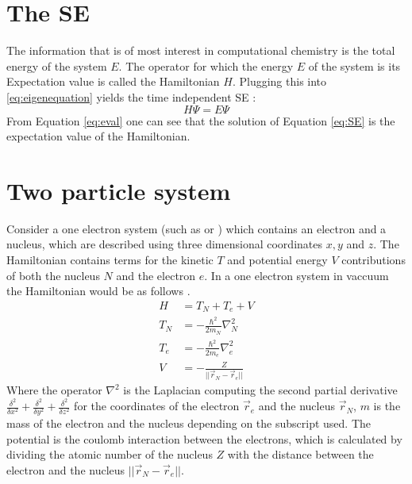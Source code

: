 \documentclass[../master_thesis.tex]{subfiles}
\begin{document}
\section{The \ac{SE}}
The information that is of most interest in computational chemistry is the
total energy of the system $ E $. The operator for which the energy $E$ of the
system is its Expectation value is called the Hamiltonian $H$. Plugging this
into \ref{eq:eigenequation} yields the time independent \ac{SE}
\cite{Cramer:2004, Jensen:2017}:
\begin{equation}
  H\Psi = E\Psi\label{eq:SE}
\end{equation}
From Equation \ref{eq:eval} one can see that the solution of Equation
\ref{eq:SE} is the expectation value of the Hamiltonian.



\section{Two particle system}
Consider a one electron system (such as  or ) which contains an
electron and a nucleus, which are described using three dimensional coordinates
$ x, y $ and $ z $. The Hamiltonian contains terms for the kinetic $T$ and
potential energy $V$ contributions of both the nucleus $ N $ and the electron
$ e $. In a one electron system in vaccuum the Hamiltonian would be as follows
\cite{Jensen:2017, Cramer:2004}.
\begin{equation}
  \begin{aligned}
    H   &= T_N + T_e + V \\
    T_N &= -\frac{\hbar^2}{2m_N}\nabla^2_N \\
    T_e &= -\frac{\hbar^2}{2m_e}\nabla^2_e \\
    V   &= -\frac{Z}{||\vec{r}_N - \vec{r}_e||} \label{eq:twopH}
  \end{aligned}
\end{equation}
Where the operator $ \nabla^2$ is the Laplacian computing the second partial
derivative $ \frac{\delta^2}{\delta x^2} + \frac{\delta^2}{\delta y^2} +
\frac{\delta^2}{\delta z^2} $ for the coordinates of the electron $\vec{r}_e$
and the nucleus $\vec{r}_N$, $ m $ is the mass of the electron and the nucleus
depending on the subscript used. The potential is the coulomb interaction
between the electrons, which is calculated by dividing the atomic number of the
nucleus $ Z $ with the distance between the electron and the nucleus
$ ||\vec{r}_N - \vec{r}_e|| $.
\end{document}
